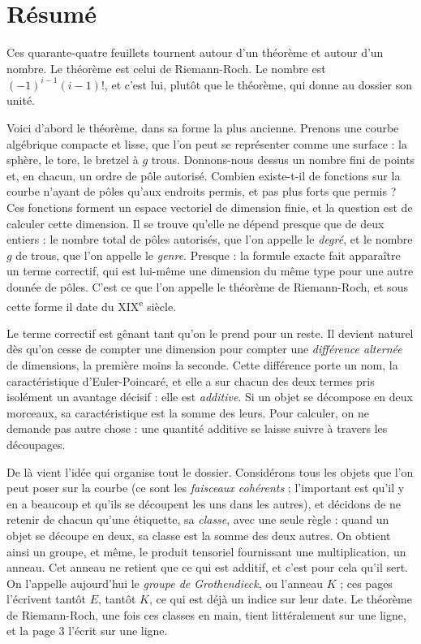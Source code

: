 \documentclass[11pt,a4paper]{article}
\begin{document}
\section*{Résumé}

\begin{resume}
Ces quarante-quatre feuillets tournent autour d'un théorème et autour d'un
nombre. Le théorème est celui de Riemann-Roch. Le nombre est
$(-1)^{i-1}(i-1)!$, et c'est lui, plutôt que le théorème, qui donne au dossier
son unité.

Voici d'abord le théorème, dans sa forme la plus ancienne. Prenons une courbe
algébrique compacte et lisse, que l'on peut se représenter comme une surface :
la sphère, le tore, le bretzel à $g$ trous. Donnons-nous dessus un nombre fini
de points et, en chacun, un ordre de pôle autorisé. Combien existe-t-il de
fonctions sur la courbe n'ayant de pôles qu'aux endroits permis, et pas plus
forts que permis ? Ces fonctions forment un espace vectoriel de dimension
finie, et la question est de calculer cette dimension. Il se trouve qu'elle ne
dépend presque que de deux entiers : le nombre total de pôles autorisés, que
l'on appelle le \emph{degré}, et le nombre $g$ de trous, que l'on appelle le
\emph{genre}. Presque : la formule exacte fait apparaître un terme correctif,
qui est lui-même une dimension du même type pour une autre donnée de pôles.
C'est ce que l'on appelle le théorème de Riemann-Roch, et sous cette forme il
date du XIX\textsuperscript{e} siècle.

Le terme correctif est gênant tant qu'on le prend pour un reste. Il devient
naturel dès qu'on cesse de compter une dimension pour compter une
\emph{différence alternée} de dimensions, la première moins la seconde.
Cette différence porte un nom, la caractéristique d'Euler-Poincaré, et elle a
sur chacun des deux termes pris isolément un avantage décisif : elle est
\emph{additive}. Si un objet se décompose en deux morceaux, sa caractéristique
est la somme des leurs. Pour calculer, on ne demande pas autre chose :
une quantité additive se laisse suivre à travers les découpages.

De là vient l'idée qui organise tout le dossier. Considérons tous les objets
que l'on peut poser sur la courbe (ce sont les \emph{faisceaux cohérents} ;
l'important est qu'il y en a beaucoup et qu'ils se découpent les uns dans
les autres), et décidons de ne retenir de chacun qu'une étiquette, sa
\emph{classe}, avec une seule règle : quand un objet se découpe en deux, sa
classe est la somme des deux autres. On obtient ainsi un groupe, et même, le
produit tensoriel fournissant une multiplication, un anneau. Cet anneau ne
retient que ce qui est additif, et c'est pour cela qu'il sert. On
l'appelle aujourd'hui le \emph{groupe de Grothendieck}, ou l'anneau
$K$ ; ces pages l'écrivent tantôt $E$, tantôt $K$, ce qui est déjà un indice
sur leur date. Le théorème de Riemann-Roch, une fois ces classes en main, tient
littéralement sur une ligne, et la page 3 l'écrit sur une ligne.


\end{resume}
\end{document}
